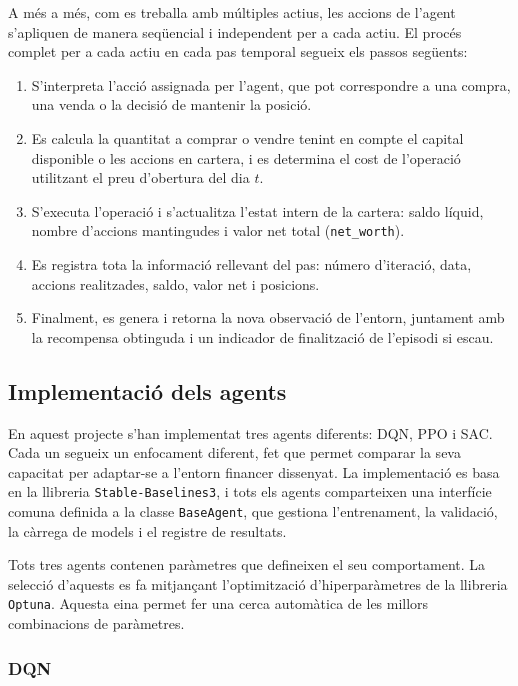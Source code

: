 \documentclass[12pt,a4paper,twoside]{book}
\begin{document}
A més a més, com es treballa amb múltiples actius, les accions de l'agent s'apliquen de manera seqüencial i independent per a cada actiu. El procés complet per a cada actiu en cada pas temporal segueix els passos següents:

\begin{enumerate}
    \item S'interpreta l'acció assignada per l'agent, que pot correspondre a una compra, una venda o la decisió de mantenir la posició.
    \item Es calcula la quantitat a comprar o vendre tenint en compte el capital disponible o les accions en cartera, i es determina el cost de l'operació utilitzant el preu d'obertura del dia $t$.
    \item S'executa l'operació i s'actualitza l'estat intern de la cartera: saldo líquid, nombre d'accions mantingudes i valor net total (\texttt{net\_worth}).
    \item Es registra tota la informació rellevant del pas: número d'iteració, data, accions realitzades, saldo, valor net i posicions.
    \item Finalment, es genera i retorna la nova observació de l'entorn, juntament amb la recompensa obtinguda i un indicador de finalització de l'episodi si escau.
\end{enumerate}


\subsection{Implementació dels agents}

En aquest projecte s'han implementat tres agents diferents: DQN, PPO i SAC. Cada un segueix un enfocament diferent, fet que permet comparar la seva capacitat per adaptar-se a l'entorn financer dissenyat. La implementació es basa en la llibreria \texttt{Stable-Baselines3}, i tots els agents comparteixen una interfície comuna definida a la classe \texttt{BaseAgent}, que gestiona l'entrenament, la validació, la càrrega de models i el registre de resultats.

Tots tres agents contenen paràmetres que defineixen el seu comportament. La selecció d'aquests es fa mitjançant l'optimització d'hiperparàmetres de la llibreria \texttt{Optuna}. Aquesta eina permet fer una cerca automàtica de les millors combinacions de paràmetres.

\subsubsection{DQN}
\end{document}
